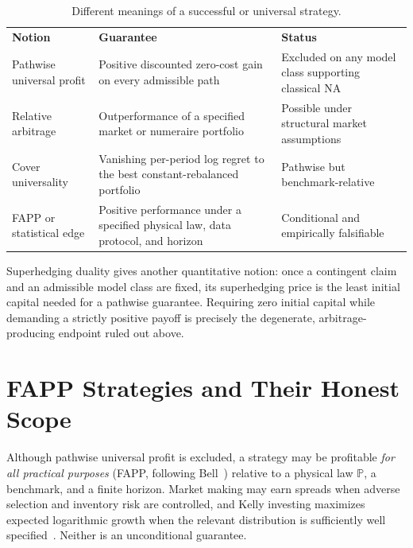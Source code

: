 \documentclass[aps,pra,reprint,superscriptaddress,amsmath,amssymb,floatfix]{revtex4-2}
\theoremstyle{plain}
\theoremstyle{definition}
\theoremstyle{remark}
\begin{document}
\begin{table}[ht]
\caption{\label{tab:hierarchy}Different meanings of a successful or universal strategy.}
\centering
\begin{ruledtabular}
\begin{tabular}{p{}p{}p{}}
\textbf{Notion} & \textbf{Guarantee} & \textbf{Status} \\
\colrule
Pathwise universal profit
& Positive discounted zero-cost gain on every admissible path
& Excluded on any model class supporting classical NA \\
Relative arbitrage
& Outperformance of a specified market or numeraire portfolio
& Possible under structural market assumptions \\
Cover universality
& Vanishing per-period log regret to the best constant-rebalanced portfolio
& Pathwise but benchmark-relative \\
FAPP or statistical edge
& Positive performance under a specified physical law, data protocol, and horizon
& Conditional and empirically falsifiable \\
\end{tabular}
\end{ruledtabular}
\end{table}

Superhedging duality gives another quantitative notion: once a contingent
claim and an admissible model class are fixed, its superhedging price is the
least initial capital needed for a pathwise guarantee. Requiring zero initial
capital while demanding a strictly positive payoff is precisely the
degenerate, arbitrage-producing endpoint ruled out above.

\section{FAPP Strategies and Their Honest Scope}
\label{sec:fapp}

Although pathwise universal profit is excluded, a strategy may be profitable
\emph{for all practical purposes} (FAPP, following Bell~\cite{bell-a}) relative
to a physical law \(\mathbb P\), a benchmark, and a finite horizon. Market
making may earn spreads when adverse selection and inventory risk are
controlled, and Kelly investing maximizes expected logarithmic growth when the
relevant distribution is sufficiently well specified~\cite{Kelly1956}. Neither
is an unconditional guarantee.
\end{document}
